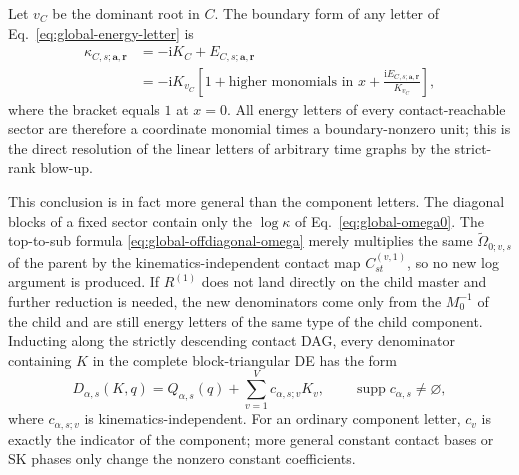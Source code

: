 \documentclass[11pt,a4paper]{article}
\newcommand{\ii}{\mathrm i}
\begin{document}
Let $v_C$ be the dominant root in $C$. The boundary form of any letter of Eq.~\eqref{eq:global-energy-letter} is
\begin{equation}
 \begin{split}
 \kappa_{C,s;\bm a,\bm r}
 &=-\ii K_C+E_{C,s;\bm a,\bm r}\\
 &=-\ii K_{v_C}
 \left[1+\text{higher monomials in }x
 +\frac{\ii E_{C,s;\bm a,\bm r}}{K_{v_C}}\right],
 \end{split}
 \label{eq:boundary-letter-unit}
\end{equation}
where the bracket equals $1$ at $x=0$. All energy letters of every contact-reachable sector are therefore a coordinate monomial times a boundary-nonzero unit; this is the direct resolution of the linear letters of arbitrary time graphs by the strict-rank blow-up.

This conclusion is in fact more general than the component letters. The diagonal blocks of a fixed sector contain only the $\log\kappa$ of Eq.~\eqref{eq:global-omega0}. The top-to-sub formula \eqref{eq:global-offdiagonal-omega} merely multiplies the same $\widetilde\Omega_{0;v,s}$ of the parent by the kinematics-independent contact map $C_{st}^{(v,1)}$, so no new log argument is produced. If $R^{(1)}$ does not land directly on the child master and further reduction is needed, the new denominators come only from the $M_0^{-1}$ of the child and are still energy letters of the same type of the child component. Inducting along the strictly descending contact DAG, every denominator containing $K$ in the complete block-triangular DE has the form
\begin{equation}
 D_{\alpha,s}(K,q)
 =Q_{\alpha,s}(q)
 +\sum_{v=1}^{V}c_{\alpha,s;v}K_v,
 \qquad
 \operatorname{supp}c_{\alpha,s}\neq\varnothing,
 \label{eq:general-affine-K-divisor}
\end{equation}
where $c_{\alpha,s;v}$ is kinematics-independent. For an ordinary component letter, $c_v$ is exactly the indicator of the component; more general constant contact bases or SK phases only change the nonzero constant coefficients.
\end{document}
